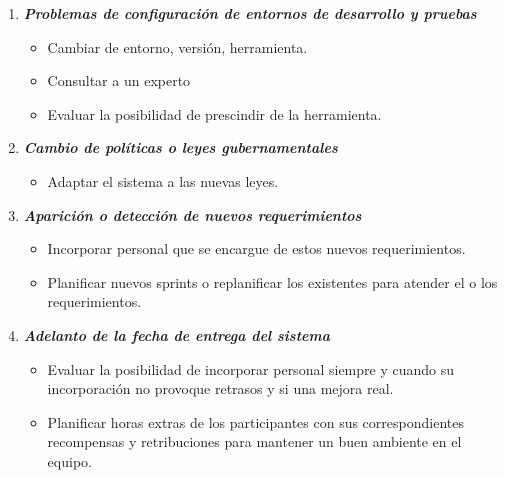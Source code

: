 \begin{enumerate}
        \item \textbf{\textit{Problemas de configuración de entornos de desarrollo y pruebas}}
        	\begin{itemize}
				\item Cambiar de entorno, versión, herramienta.
                \item Consultar a un experto
                \item Evaluar la posibilidad de prescindir de la herramienta.
			\end{itemize}
        \item \textbf{\textit{Cambio de políticas o leyes gubernamentales}}
        	\begin{itemize}
				\item Adaptar el sistema a las nuevas leyes.
			\end{itemize}
        \item \textbf{\textit{Aparición o detección de nuevos requerimientos}}
        	\begin{itemize}
				\item Incorporar personal que se encargue de estos nuevos requerimientos.
                \item Planificar nuevos sprints o replanificar los existentes para atender el o los requerimientos.              
			\end{itemize}
        \item \textbf{\textit{Adelanto de la fecha de entrega del sistema}}
        	\begin{itemize}
				\item Evaluar la posibilidad de incorporar personal siempre y cuando su incorporación no provoque retrasos y si una mejora real.
                \item Planificar horas extras de los participantes con sus correspondientes recompensas y retribuciones para mantener un buen ambiente en el equipo.
			\end{itemize}
	\end{enumerate}
    
\begin{comment}
Cuantificar riesgos, analizar resultados

− Identificar todos los riesgos conocidos del proyecto
− Realizar una evaluación de la probabilidad de ocurrencia y del impacto
    potencial
− Cuantificar cual sería el coste de los riesgos en caso de que ocurrieran
− Crear planes de acción para gestionar los riesgos de alta prioridad
− Reconocer y gestionar los riesgos lo antes posible
\end{comment}

